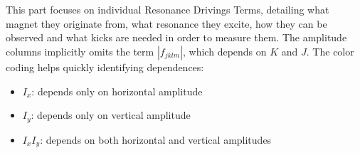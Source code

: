 \section{}

This part focuses on individual Resonance Drivings Terms, detailing what magnet they originate
from, what resonance they excite, how they can be observed and what kicks are needed in order to
measure them. The amplitude columns implicitly omits the term $|f_{jklm}|$, which depends on $K$
and $J$. The color coding helps quickly identifying dependences:

\begin{itemize}
\tightlist
\item
  \colorbox{orange!20}{$I_x$}: depends only on horizontal amplitude
\item
  \colorbox{red!20}{$I_y$}: depends only on vertical amplitude
\item
  \colorbox{blue!20}{$I_x I_y$}: depends on both horizontal and vertical
  amplitudes
\end{itemize}

